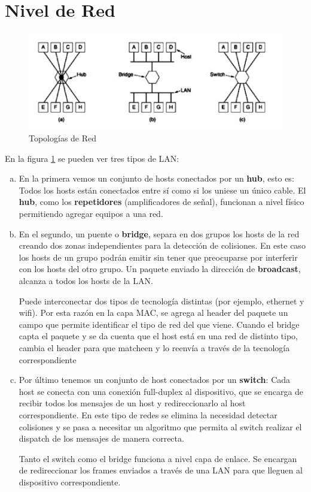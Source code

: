 \part{Nivel de Red}
\begin{figure}[H]
	\centering
	\includegraphics[width=\textwidth
]{images/topologias-red.png}
	\caption[Topologías de Red]{Topologías de Red}
	\label{fig:topologias-red}
\end{figure}
En la figura \ref{fig:topologias-red} se pueden ver tres tipos de LAN:
\begin{enumerate}[a)]
  \item En la primera vemos un conjunto de hosts conectados por un \textbf{hub}, esto es: Todos los hosts están conectados entre sí como si los uniese un único cable. El \textbf{hub}, como los \textbf{repetidores} (amplificadores de señal), funcionan a nivel físico permitiendo agregar equipos a una red.
  \item En el segundo, un puente o \textbf{bridge}, separa en dos grupos los hosts de la red creando dos zonas independientes para la detección de colisiones. En este caso los hosts de un grupo podrán emitir sin tener que preocuparse por interferir con los hosts del otro grupo. Un paquete enviado la dirección de \textbf{broadcast}, alcanza a todos los hosts de la LAN.
  
  Puede interconectar dos tipos de tecnología distintas (por ejemplo, ethernet y wifi). Por esta razón en la capa MAC, se agrega al header del paquete un campo que permite identificar el tipo de red del que viene. Cuando el bridge capta el paquete y se da cuenta que el host está en una red de distinto tipo, cambia el header para que matcheen y lo reenvía a través de la tecnología correspondiente
  \item Por último tenemos un conjunto de host conectados por un \textbf{switch}: Cada host se conecta con una conexión full-duplex al dispositivo, que se encarga de recibir todos los mensajes de un host y redireccionarlo al host correspondiente. En este tipo de redes se elimina la necesidad detectar colisiones y se pasa a necesitar un algoritmo que permita al switch realizar el dispatch de los mensajes de manera correcta.
  
  Tanto el switch como el bridge funciona a nivel capa de enlace. Se encargan de redireccionar los frames enviados a través de una LAN para que lleguen al dispositivo correspondiente.
\end{enumerate}

